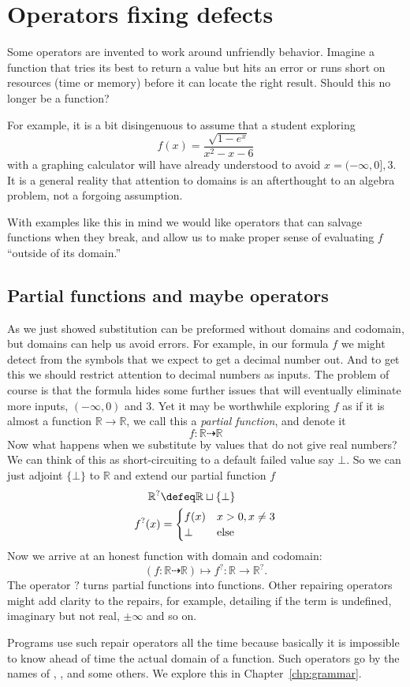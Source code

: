 
\section{Operators fixing defects}
Some operators are invented to work around unfriendly behavior.
Imagine a function that tries its best to return a value but 
hits an error or runs short on resources (time or memory) before 
it can locate the right result.  Should this no longer be a function?

For example, it is a bit disingenuous 
to assume that a student exploring 
\[
    f(x) = \frac{\sqrt{1-e^x}}{x^2-x-6}
\]
with a graphing calculator will have already understood to 
avoid $x=(-\infty,0],3$.  It is a general reality that attention to 
domains is an afterthought to an algebra problem,
not a forgoing assumption.  

With examples like this in mind we would like operators that 
can salvage functions when they break, and allow us to make proper 
sense of evaluating $f$ ``outside of its domain.''



\subsection{Partial functions and maybe operators}
As we just showed substitution can be preformed without domains and codomain, but 
domains can help us avoid errors.  For example, in our formula $f$ we might detect 
from the symbols that we expect to get a decimal number out.  And to get this 
we should restrict attention to decimal numbers as inputs. 
The problem of course is that the formula hides some further issues that will 
eventually eliminate more inputs, $(-\infty,0)$ and $3$.  Yet it may be 
worthwhile exploring $f$ as if it is almost a function $\mathbb{R}\to \mathbb{R}$,
we call this a \emph{partial function}, and denote it 
\[ 
    f:\mathbb{R}\dashrightarrow \mathbb{R}
\] 
Now what happens when we substitute by values that do not give real numbers?  We 
can think of this as short-circuiting to a default failed value say $\bot$.  So 
we can just adjoint $\{\bot\}$ to $\mathbb{R}$ and extend our partial function $f$
\begin{align*}
    \mathbb{R}^? & \defeq \mathbb{R}\sqcup \{\bot \}\\
    f^?(x) & = \begin{cases}
                f(x)  & x>0, x\neq 3\\
                \bot & \text{else}
    \end{cases}             
\end{align*}
Now we arrive at an honest function with domain and codomain:
\[
    (f:\mathbb{R}\dashrightarrow \mathbb{R})\mapsto f^?:\mathbb{R}\to \mathbb{R}^?.
\]
The operator $?$ turns partial functions into functions.
Other repairing operators might add clarity to the repairs, for example, 
detailing if the term is undefined, imaginary but not real, $\pm\infty$ and so on.

Programs use such repair operators all the time because basically it is impossible to 
know ahead of time the actual domain of a function.  Such operators go by the 
names of , ,  and some others.
We explore this in  Chapter~\ref{chp:grammar}.
